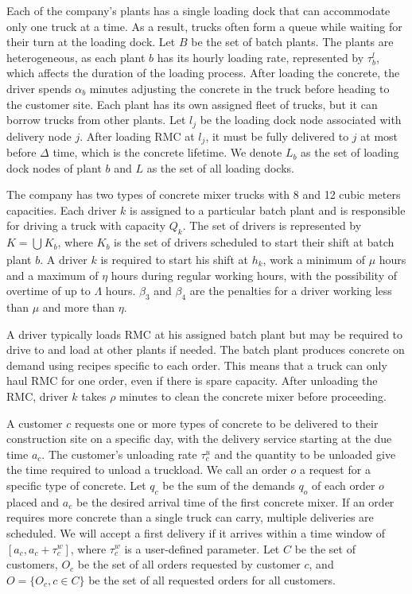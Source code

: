 \documentclass{article}
\begin{document}
Each of the company's plants has a single loading dock that can accommodate only one truck at a time. As a result, trucks often form a queue while waiting for their turn at the loading dock. Let $B$ be the set of batch plants. The plants are heterogeneous, as each plant $b$ has its hourly loading rate, represented by $\tau^l_b$, which affects the duration of the loading process. After loading the concrete, the driver spends $\alpha_b$ minutes adjusting the concrete in the truck before heading to the customer site. Each plant has its own assigned fleet of trucks, but it can borrow trucks from other plants. Let $l_{j}$ be the loading dock node associated with delivery node $j$. After loading RMC at $l_j$, it must be fully delivered to $j$ at most before $\Delta$ time, which is the concrete lifetime. We denote $L_b$ as the set of loading dock nodes of plant $b$ and $L$ as the set of all loading docks.

The company has two types of concrete mixer trucks with 8 and 12 cubic meters capacities. Each driver $k$ is assigned to a particular batch plant and is responsible for driving a truck with capacity $Q_k$. The set of drivers is represented by $K =\bigcup_{}K_b $, where $K_b$ is the set of drivers scheduled to start their shift at batch plant $b$. A driver $k$ is required to start his shift at $h_k$, work a minimum of $\mu$ hours and a maximum of $\eta$ hours during regular working hours, with the possibility of overtime of up to $\varLambda$ hours. $\beta_3$ and $\beta_4$ are the penalties for a driver working less than $\mu$ and more than $\eta$.

A driver typically loads RMC at his assigned batch plant but may be required to drive to and load at other plants if needed. The batch plant produces concrete on demand using recipes specific to each order. This means that a truck can only haul RMC for one order, even if there is spare capacity. After unloading the RMC,  driver $k$ takes $\rho$ minutes to clean the concrete mixer before proceeding.


A customer $c$ requests one or more types of concrete to be delivered to their construction site on a specific day, with the delivery service starting at the due time $a_c$. The customer's unloading rate $\tau^u_c$ and the quantity to be unloaded give the time required to unload a truckload. We call an order $o$ a request for a specific type of concrete. Let $q_c$ be the sum of the demands $q_o$ of each order $o$ placed and $a_c$ be the desired arrival time of the first concrete mixer. If an order requires more concrete than a single truck can carry, multiple deliveries are scheduled. We will accept a first delivery if it arrives within a time window of $\left[a_c, a_c + \tau^w_c \right]$, where $\tau^w_c$ is a user-defined parameter. Let $C$ be the set of customers, $O_c$ be the set of all orders requested by customer $c$, and $O=\{O_c, c \in C\}$ be the set of all requested orders for all customers.
\end{document}
